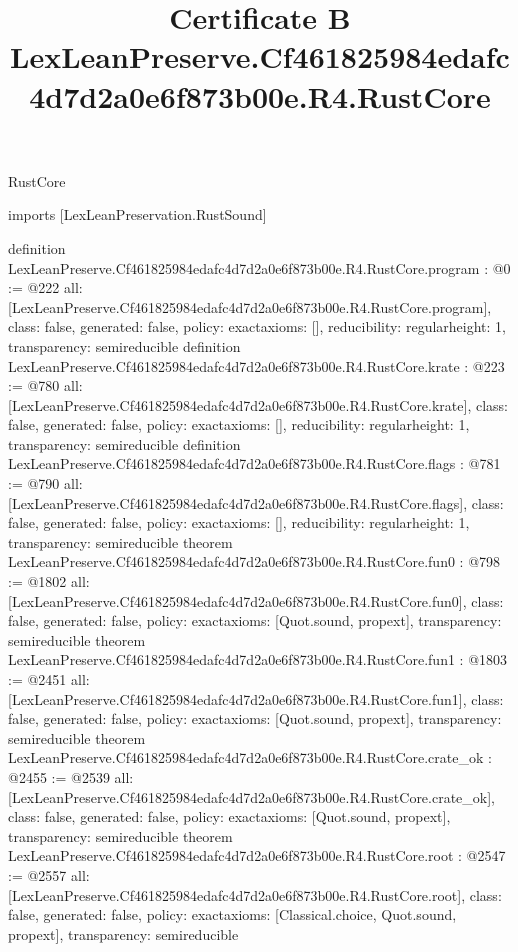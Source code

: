 \begin{lexlean}{RustCore}
\title{Certificate B LexLeanPreserve.Cf461825984edafc4d7d2a0e6f873b00e.R4.RustCore}
\begin{coremodule}
imports [LexLeanPreservation.RustSound]

definition LexLeanPreserve.Cf461825984edafc4d7d2a0e6f873b00e.R4.RustCore.program : @0 := @222 {
  all: [LexLeanPreserve.Cf461825984edafc4d7d2a0e6f873b00e.R4.RustCore.program],
  class: false,
  generated: false,
  policy: exact{axioms: []},
  reducibility: regular{height: 1},
  transparency: semireducible
}
definition LexLeanPreserve.Cf461825984edafc4d7d2a0e6f873b00e.R4.RustCore.krate : @223 := @780 {
  all: [LexLeanPreserve.Cf461825984edafc4d7d2a0e6f873b00e.R4.RustCore.krate],
  class: false,
  generated: false,
  policy: exact{axioms: []},
  reducibility: regular{height: 1},
  transparency: semireducible
}
definition LexLeanPreserve.Cf461825984edafc4d7d2a0e6f873b00e.R4.RustCore.flags : @781 := @790 {
  all: [LexLeanPreserve.Cf461825984edafc4d7d2a0e6f873b00e.R4.RustCore.flags],
  class: false,
  generated: false,
  policy: exact{axioms: []},
  reducibility: regular{height: 1},
  transparency: semireducible
}
theorem LexLeanPreserve.Cf461825984edafc4d7d2a0e6f873b00e.R4.RustCore.fun0 : @798 := @1802 {
  all: [LexLeanPreserve.Cf461825984edafc4d7d2a0e6f873b00e.R4.RustCore.fun0],
  class: false,
  generated: false,
  policy: exact{axioms: [Quot.sound, propext]},
  transparency: semireducible
}
theorem LexLeanPreserve.Cf461825984edafc4d7d2a0e6f873b00e.R4.RustCore.fun1 : @1803 := @2451 {
  all: [LexLeanPreserve.Cf461825984edafc4d7d2a0e6f873b00e.R4.RustCore.fun1],
  class: false,
  generated: false,
  policy: exact{axioms: [Quot.sound, propext]},
  transparency: semireducible
}
theorem LexLeanPreserve.Cf461825984edafc4d7d2a0e6f873b00e.R4.RustCore.crate_ok : @2455 := @2539 {
  all: [LexLeanPreserve.Cf461825984edafc4d7d2a0e6f873b00e.R4.RustCore.crate_ok],
  class: false,
  generated: false,
  policy: exact{axioms: [Quot.sound, propext]},
  transparency: semireducible
}
theorem LexLeanPreserve.Cf461825984edafc4d7d2a0e6f873b00e.R4.RustCore.root : @2547 := @2557 {
  all: [LexLeanPreserve.Cf461825984edafc4d7d2a0e6f873b00e.R4.RustCore.root],
  class: false,
  generated: false,
  policy: exact{axioms: [Classical.choice, Quot.sound, propext]},
  transparency: semireducible
}


\end{coremodule}
\end{lexlean}
